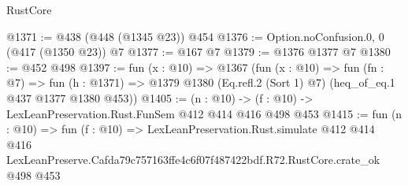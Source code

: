 \begin{lexlean}{RustCore}
\begin{coremodule}
@1371 := @438 (@448 (@1345 @23)) @454
@1376 := Option.noConfusion.{0, 0} (@417 (@1350 @23)) @7
@1377 := @167 @7
@1379 := @1376 @1377 @7
@1380 := @452 @498
@1397 := fun (x : @10) =>
  @1367
    (fun (x : @10) =>
    fun (fn : @7) =>
    fun (h : @1371) => @1379 @1380 (Eq.refl.{2} (Sort 1) @7) (heq_of_eq.{1} @437 @1377 @1380 @453))
@1405 := (n : @10) -> (f : @10) -> LexLeanPreservation.Rust.FunSem @412 @414 @416 @498 @453
@1415 := fun (n : @10) =>
  fun (f : @10) =>
  LexLeanPreservation.Rust.simulate
    @412
    @414
    @416
    LexLeanPreserve.Cafda79c757163ffe4c6f07f487422bdf.R72.RustCore.crate_ok
    @498
    @453
\end{coremodule}
\end{lexlean}

